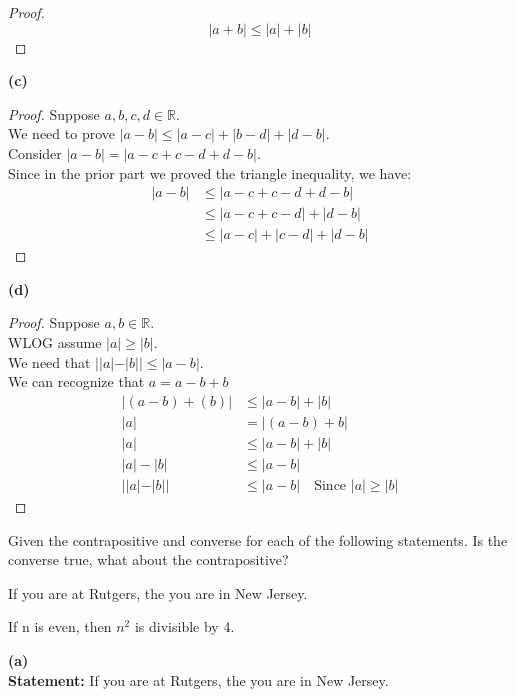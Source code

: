 \documentclass[answers,12pt,addpoints]{exam}
\begin{document}
\begin{questions}
\begin{solution}
\begin{proof}
        $$ |a+b| \leq |a| + |b| $$
    \end{proof}
    \textbf{(c)}
    \begin{proof}
        Suppose $a,b,c,d \in \mathbb{R}$. \\
        We need to prove $|a-b| \leq |a-c| + |b-d| + |d-b|$. \\
        Consider $|a-b| = |a-c + c-d + d-b|$. \\
        Since in the prior part we proved the triangle inequality, we have: \\
        \begin{align*}
            |a-b| &\leq |a-c + c-d + d-b| \\
            &\leq |a-c + c-d| + |d-b| \\
            &\leq |a-c| + |c-d| + |d-b|
        \end{align*}
    \end{proof}
    \textbf{(d)}
    \begin{proof}
        Suppose $a,b \in \mathbb{R}$. \\
        WLOG assume $|a| \geq |b|$. \\
        We need that $||a|-|b|| \leq |a-b|$. \\
        We can recognize that $a = a - b + b$ \\
        \begin{align*}
            |(a - b) + (b)| &\leq |a-b| + |b| \\
            |a| &= |(a-b) + b| \\
            |a| &\leq |a-b| + |b| \\
            |a| - |b| &\leq |a-b|\\ 
            ||a|-|b|| &\leq |a-b| \quad \text{Since $|a| \geq |b|$}
        \end{align*}
    \end{proof}
    \end{solution}
    \question Given the contrapositive and converse for each of the following statements. Is the converse true, what about the contrapositive?
    \begin{parts}
        \item If you are at Rutgers, the you are in New Jersey.
        \item If n is even, then $n^2$ is divisible by 4.
    \end{parts}
    \begin{solution}
        \textbf{(a)}\\
        \textbf{Statement:} If you are at Rutgers, the you are in New Jersey. \\

\end{solution}
\end{questions}
\end{document}
